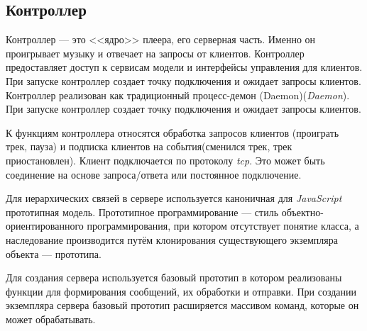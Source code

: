 \subsection{Контроллер }

Контроллер --- это <<ядро>> плеера, его серверная часть. Именно он проигрывает музыку и
отвечает на запросы от клиентов. Контроллер предоставляет доступ к
сервисам модели и интерфейсы управления для клиентов. При запуске
контроллер создает точку подключения и ожидает запросы клиентов.
Контроллер реализован как традиционный процесс-демон (Daemon)(\textit{Daemon}).  При
запуске контроллер создает точку подключения и ожидает запросы клиентов.

К функциям контроллера относятся обработка запросов клиентов
(проиграть трек, пауза) и подписка клиентов на события(сменился трек,
трек приостановлен). Клиент подключается по протоколу
\textit{tcp}. Это может быть соединение на основе запроса/ответа или
постоянное подключение.


Для иерархических связей в сервере используется каноничная для
\textit{JavaScript} прототипная модель.  Прототипное программирование
--- стиль объектно-ориентированного программирования, при котором
отсутствует понятие класса, а наследование производится путём
клонирования существующего экземпляра объекта --- прототипа\cite{wiki:prototype}.

Для создания сервера используется базовый прототип в котором реализованы функции
для формирования сообщений, их обработки и отправки. При создании экземпляра
сервера базовый прототип расширяется массивом команд, которые он может
обрабатывать.
